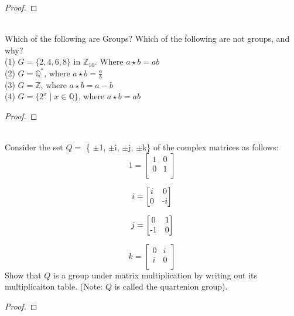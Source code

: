\documentclass[12pt]{article}
\newcommand{\Z}{\mathbb{Z}}
\newcommand{\Q}{\mathbb{Q}}
\newenvironment{problem}[2][Problem]{\begin{trivlist}
\item[\hskip \labelsep {\bfseries #1}\hskip \labelsep {\bfseries #2.}]}{\end{trivlist}}
\begin{document}
\begin{proof}

\end{proof}

\begin{problem}{6}
\text{ }\\
Which of the following are Groups? Which of the following are not groups, and why?\\

\indent (1)  $G = \{{2, 4, 6, 8}\}$ in $\Z_{10}$.  Where $a \star b = ab$\\
\indent (2)  $G = \Q^{\ast}$, where $a \star b = \frac{a}{b}$\\
\indent (3) $G = \Z$, where $a \star b = a - b$\\
\indent (4) $G = \{ {2^{x}\mid x \in \Q} \}$, where $a \star b = ab$\\
 
\end{problem}
 
\begin{proof}

\end{proof}

\begin{problem}{7}
\text{ }\\
Consider the set $Q =$ \{ $\pm$1, $\pm$i, $\pm$j, $\pm$k\} of the complex matrices as follows:\\
\[
1=
  \begin{bmatrix}
    1 & 0\\
    0 & 1\\
  \end{bmatrix}
\]

\[
i=
  \begin{bmatrix}
    i & 0\\
    0 & $-$i\\
  \end{bmatrix}
\]

\[
j=
  \begin{bmatrix}
    0 & 1\\
    $-$1 & 0\\
  \end{bmatrix}
\]

\[
k=
  \begin{bmatrix}
    0 & i\\
    i & 0\\
  \end{bmatrix}
\]
Show that $Q$ is a group under matrix multiplication by writing out its multiplicaiton table. (Note: $Q$ is called the quartenion group).
\end{problem}
\begin{proof}

\end{proof}
\end{document}
